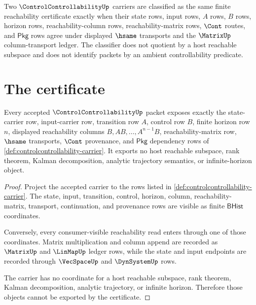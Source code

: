 \begin{definition}
\label{def:controlcontrollability-classifier}
Two $\ControlControllabilityUp$ carriers are classified as the same finite reachability certificate exactly when their state rows, input rows, $A$ rows, $B$ rows, horizon rows, reachability-column rows, reachability-matrix rows, $\Cont$ routes, and $\mathsf{Pkg}$ rows agree under displayed $\hsame$ transports and the $\MatrixUp$ column-transport ledger. The classifier does not quotient by a host reachable subspace and does not identify packets by an ambient controllability predicate.
\end{definition}

\section{The certificate}
\label{sec:controlcontrollability-certificate}

\begin{theorem}
\label{thm:controlcontrollability-reachability-ledger}
Every accepted $\ControlControllabilityUp$ packet exposes exactly the state-carrier row, input-carrier row, transition row $A$, control row $B$, finite horizon row $n$, displayed reachability columns $B,AB,\ldots,A^{n-1}B$, reachability-matrix row, $\hsame$ transports, $\Cont$ provenance, and $\mathsf{Pkg}$ dependency rows of \autoref{def:controlcontrollability-carrier}. It exports no host reachable subspace, rank theorem, Kalman decomposition, analytic trajectory semantics, or infinite-horizon object.
\end{theorem}
\begin{proof}
Project the accepted carrier to the rows listed in \autoref{def:controlcontrollability-carrier}. The state, input, transition, control, horizon, column, reachability-matrix, transport, continuation, and provenance rows are visible as finite $\mathsf{BHist}$ coordinates.

Conversely, every consumer-visible reachability read enters through one of those coordinates. Matrix multiplication and column append are recorded as $\MatrixUp$ and $\LinMapUp$ ledger rows, while the state and input endpoints are recorded through $\VecSpaceUp$ and $\DynSystemUp$ rows.

The carrier has no coordinate for a host reachable subspace, rank theorem, Kalman decomposition, analytic trajectory, or infinite horizon. Therefore those objects cannot be exported by the certificate.
\end{proof}


